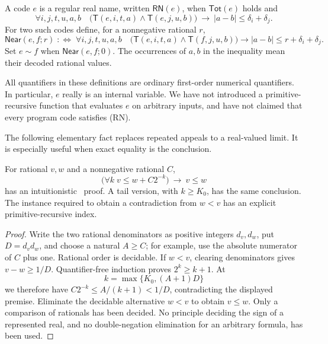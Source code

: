 \begin{definition}
A code $e$ is a regular real name, written $\mathsf{RN}(e)$, when
$\mathsf{Tot}(e)$ holds and
\[
 \forall i,j,t,u,a,b\quad
 \bigl(\mathsf T(e,i,t,a)\wedge\mathsf T(e,j,u,b)\bigr)
 \ \longrightarrow\ |a-b|\leq\delta_i+\delta_j.
 \tag{RN}
\]
For two such codes define, for a nonnegative rational $r$,
\[
 \mathsf{Near}(e,f;r)\;:\!\!\iff\;
 \forall i,j,t,u,a,b\quad
 \bigl(\mathsf T(e,i,t,a)\wedge\mathsf T(f,j,u,b)\bigr)
 \longrightarrow |a-b|\leq r+\delta_i+\delta_j.
 \tag{N}
\]
Set $e\sim f$ when $\mathsf{Near}(e,f;0)$. The occurrences of $a,b$ in the
inequality mean their decoded rational values.
\end{definition}

All quantifiers in these definitions are ordinary first-order numerical
quantifiers. In particular, $e$ really is an internal variable. We have not
introduced a primitive-recursive function that evaluates $e$ on arbitrary
inputs, and have not claimed that every program code satisfies (RN).

The following elementary fact replaces repeated appeals to a real-valued
limit. It is especially useful when exact equality is the conclusion.

\begin{lemma}
\label{lem:relational-slack}
For rational $v,w$ and a nonnegative rational $C$,
\[
  \bigl(\forall k\;v\leq w+C2^{-k}\bigr)\ \longrightarrow\ v\leq w
 \tag{S}
\]
has an intuitionistic \ipra\ proof. A tail version, with $k\geq K_0$, has
the same conclusion. The instance required to obtain a contradiction from
$w<v$ has an explicit primitive-recursive index.
\end{lemma}

\begin{proof}
Write the two rational denominators as positive integers $d_v,d_w$, put
$D=d_vd_w$, and choose a natural $A\geq C$; for example, use the absolute
numerator of $C$ plus one. Rational order is decidable. If $w<v$, clearing
denominators gives $v-w\geq1/D$. Quantifier-free induction proves
$2^k\geq k+1$. At
\[
       k=\max\{K_0,(A+1)D\}
\]
we therefore have $C2^{-k}\leq A/(k+1)<1/D$, contradicting the displayed
premise. Eliminate the decidable alternative $w<v$ to obtain $v\leq w$.
Only a comparison of rationals has been decided. No principle deciding the
sign of a represented real, and no double-negation elimination for an
arbitrary formula, has been used.
\end{proof}

